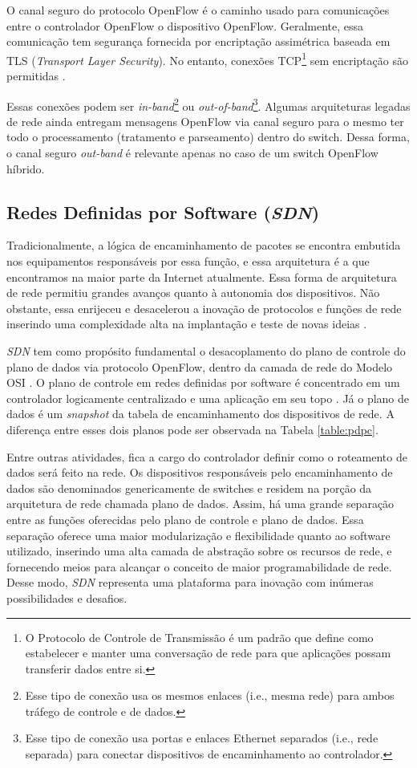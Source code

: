 \documentclass[12pt]{article}
\begin{document}
O canal seguro do protocolo OpenFlow é o caminho usado para comunicações entre o controlador OpenFlow o dispositivo OpenFlow.
Geralmente, essa comunicação tem segurança fornecida por encriptação assimétrica baseada em TLS (\textit{Transport Layer Security}).
No entanto, conexões TCP\footnote{O Protocolo de Controle de Transmissão é um padrão que define como estabelecer e manter uma conversação de rede para que aplicações possam transferir dados entre si.} sem encriptação são permitidas \cite{Goransson:2014:SDN:2671152}.

Essas conexões podem ser \textit{in-band}\footnote{Esse tipo de conexão usa os mesmos enlaces (i.e., mesma rede) para ambos tráfego de controle e de dados.} ou \textit{out-of-band}\footnote{Esse tipo de conexão usa portas e enlaces Ethernet separados (i.e., rede separada) para conectar dispositivos de encaminhamento ao controlador.}.
Algumas arquiteturas legadas de rede ainda entregam mensagens OpenFlow via canal seguro para o mesmo ter todo o processamento (tratamento e parseamento) dentro do switch.
Dessa forma, o canal seguro \textit{out-band} é relevante apenas no caso de um switch OpenFlow híbrido.

\subsection{Redes Definidas por Software (\textit{SDN})}

Tradicionalmente, a lógica de encaminhamento de pacotes se encontra embutida nos equipamentos responsáveis por essa função, e essa arquitetura é a que encontramos na maior parte da Internet atualmente.
Essa forma de arquitetura de rede permitiu grandes avanços quanto à autonomia dos dispositivos. Não obstante, essa enrijeceu e desacelerou a inovação de protocolos e funções de rede inserindo uma complexidade alta na implantação e teste de novas ideias  \cite{Mckeown_2008}.

\textit{SDN} tem como propósito fundamental o desacoplamento do plano de controle do plano de dados via protocolo OpenFlow, dentro da camada de rede do Modelo OSI \cite{1094702}.
O plano de controle em redes definidas por software é concentrado em um controlador logicamente centralizado e uma aplicação em seu topo \cite{2228312}.
Já o plano de dados é um \textit{snapshot} da tabela de encaminhamento dos dispositivos de rede.
A diferença entre esses dois planos pode ser observada na Tabela \ref{table:pdpc}.

Entre outras atividades, fica a cargo do controlador definir como o roteamento de dados será feito na rede. Os dispositivos responsáveis pelo encaminhamento de dados são denominados genericamente de switches e residem na porção da arquitetura de rede chamada plano de dados. Assim, há uma grande separação entre as funções oferecidas pelo plano de controle e plano de dados. Essa separação oferece uma maior modularização e flexibilidade quanto ao software utilizado, inserindo uma alta camada de abstração sobre os recursos de rede, e fornecendo meios para alcançar o conceito de maior programabilidade de rede.
Desse modo, \textit{SDN} representa uma plataforma para inovação com inúmeras possibilidades e desafios. 
\end{document}
